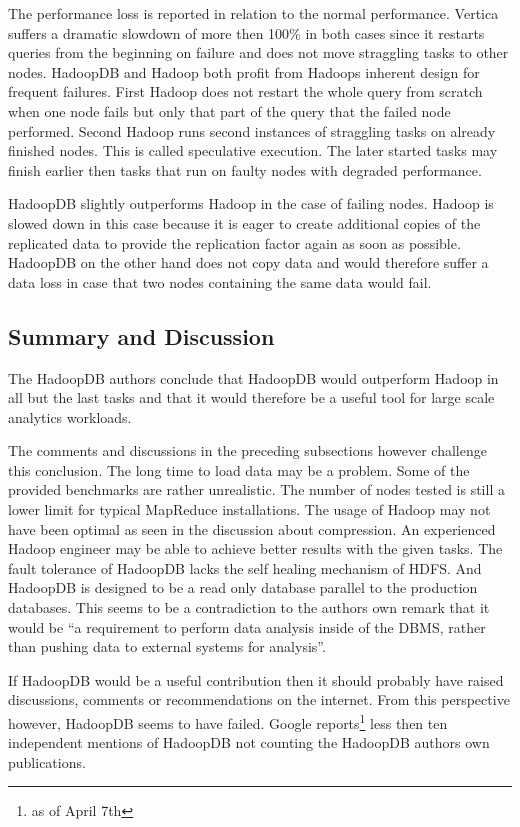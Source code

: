 \documentclass[12pt,a4paper]{scrartcl}		%
\begin{document}
The performance loss is reported in relation to the normal performance. Vertica suffers a dramatic slowdown of more then 100\% in both cases since it restarts queries from the beginning on failure and does not move straggling tasks to other nodes. HadoopDB and Hadoop both profit from Hadoops inherent design for frequent failures. First Hadoop does not restart the whole query from scratch when one node fails but only that part of the query that the failed node performed. Second Hadoop runs second instances of straggling tasks on already finished nodes. This is called speculative execution. The later started tasks may finish earlier then tasks that run on faulty nodes with degraded performance.

HadoopDB slightly outperforms Hadoop in the case of failing nodes. Hadoop is slowed down in this case because it is eager to create additional copies of the replicated data to provide the replication factor again as soon as possible. HadoopDB on the other hand does not copy data and would therefore suffer a data loss in case that two nodes containing the same data would fail.

\subsection{Summary and Discussion}
The HadoopDB authors conclude that HadoopDB would outperform Hadoop in all but the last tasks and that it would therefore be a useful tool for large scale analytics workloads.

 The comments and discussions in the preceding subsections however challenge this conclusion. The long time to load data may be a problem. Some of the provided benchmarks are rather unrealistic. The number of nodes tested is still a lower limit for typical MapReduce installations. The usage of Hadoop may not have been optimal as seen in the discussion about compression. An experienced Hadoop engineer may be able to achieve better results with the given tasks. The fault tolerance of HadoopDB lacks the self healing mechanism of HDFS. And HadoopDB is designed to be a read only database parallel to the production databases. This seems to be a contradiction to the authors own remark that it would be ``a requirement to perform data analysis inside of the DBMS, rather than pushing data to external systems for analysis''.

If HadoopDB would be a useful contribution then it should probably have raised discussions, comments or recommendations on the internet. From this perspective however, HadoopDB seems to have failed. Google reports\footnote{as of April 7th} less then ten independent mentions of HadoopDB not counting the HadoopDB authors own publications.
\end{document}
